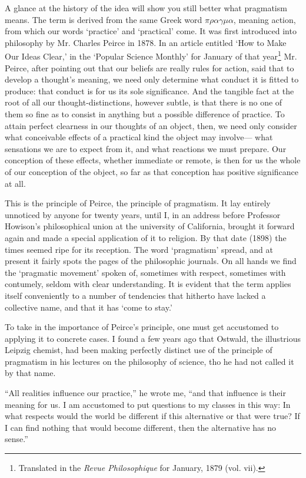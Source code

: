 \documentclass[]{article}
\begin{document}
A glance at the history of the idea will show you still better what
pragmatism means. The term is derived from the same Greek word $\pi\rho\alpha\gamma\mu\alpha$, meaning action, from which our words `practice'
and `practical' come. It was first introduced into philosophy by Mr.
Charles Peirce in 1878. In an article entitled `How to Make Our Ideas
Clear,' in the `Popular Science Monthly' for January of that year\footnote{Translated in the \emph{Revue Philosophique} for January, 1879 (vol. vii).} Mr. Peirce, after pointing out that our beliefs are really rules
for action, said that to develop a thought's meaning, we need only
determine what conduct it is fitted to produce: that conduct is for
us its sole significance. And the tangible fact at the root of all our
thought-distinctions, however subtle, is that there is no one of them so
fine as to consist in anything but a possible difference of practice.
To attain perfect clearness in our thoughts of an object, then, we need
only consider what conceivable effects of a practical kind the object
may involve--- what sensations we are to expect from it, and what
reactions we must prepare. Our conception of these effects, whether
immediate or remote, is then for us the whole of our conception of the
object, so far as that conception has positive significance at all.

This is the principle of Peirce, the principle of pragmatism. It lay
entirely unnoticed by anyone for twenty years, until I, in an address
before Professor Howison's philosophical union at the university of
California, brought it forward again and made a special application
of it to religion. By that date (1898) the times seemed ripe for its
reception. The word `pragmatism' spread, and at present it fairly
spots the pages of the philosophic journals. On all hands we find the
`pragmatic movement' spoken of, sometimes with respect, sometimes with
contumely, seldom with clear understanding. It is evident that the term
applies itself conveniently to a number of tendencies that hitherto have
lacked a collective name, and that it has `come to stay.'

To take in the importance of Peirce's principle, one must get accustomed
to applying it to concrete cases. I found a few years ago that Ostwald,
the illustrious Leipzig chemist, had been making perfectly distinct
use of the principle of pragmatism in his lectures on the philosophy of
science, tho he had not called it by that name.

``All realities influence our practice,'' he wrote me, ``and that influence
is their meaning for us. I am accustomed to put questions to my classes
in this way: In what respects would the world be different if this
alternative or that were true? If I can find nothing that would become
different, then the alternative has no sense.''
\end{document}
